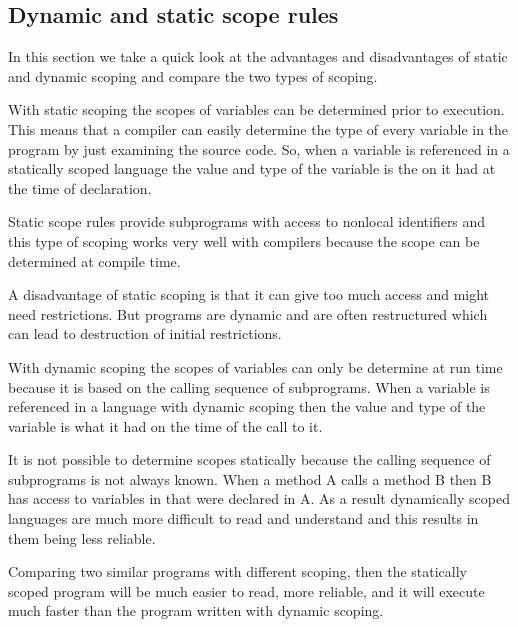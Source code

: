 \subsection{Dynamic and static scope rules}

In this section we take a quick look at the advantages and disadvantages of
static and dynamic scoping and compare the two types of scoping.

With static scoping the scopes of variables can be determined prior to
execution. This means that a compiler can easily determine the type of every
variable in the program by just examining the source code. So, when a variable
is referenced in a statically scoped language the value and type of the variable 
is the on it had at the time of declaration.
\cite[p. xxx]{sebesta2013}

Static scope rules provide subprograms with access to nonlocal identifiers and
this type of scoping works very well with compilers because the scope can be
determined at compile time.
\cite[p. xxx]{sebesta2013}

A disadvantage of static scoping is that it can give too much access and might
need restrictions. But programs are dynamic and are often restructured which
can lead to destruction of initial restrictions.
\cite[p. xxx]{sebesta2013}

With dynamic scoping the scopes of variables can only be determine at run time
because it is based on the calling sequence of subprograms. When a variable is
referenced in a language with dynamic scoping then the value and type of the 
variable is what it had on the time of the call to it.
\cite[p. xxx]{sebesta2013}

It is not possible to determine scopes statically because the calling sequence
of subprograms is not always known. When a method A calls a method B then B has 
access to variables in that were declared in A. As a result dynamically scoped
languages are much more difficult to read and understand and this results in
them being less reliable.
\cite[p. xxx]{sebesta2013}

Comparing two similar programs with different scoping, then the statically
scoped program will be much easier to read, more reliable, and it will execute
much faster than the program written with dynamic scoping.
\cite[p. xxx]{sebesta2013}
